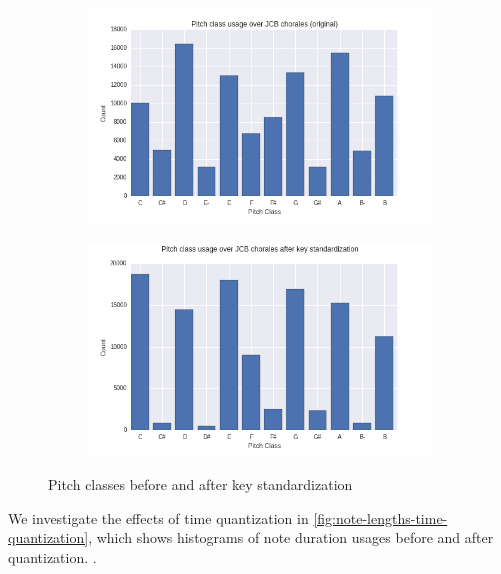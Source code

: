 \documentclass[dissertation.tex]{subfiles}
\begin{document}
\begin{figure}
    \centering
    \begin{subfigure}[b]{0.48\textwidth}
        \centering
        \includegraphics[width=1.0\linewidth]{Figures/pitch-class-usage-original.png}
    \end{subfigure}
    \begin{subfigure}[b]{0.48\textwidth}
        \centering
        \includegraphics[width=1.0\linewidth]{Figures/pitch-class-usage-preproc.png}
    \end{subfigure}
    \caption{Pitch classes before and after key standardization}
    \label{fig:pc-key-standardization}
\end{figure}

We investigate the effects of time quantization in
\autoref{fig:note-lengths-time-quantization}, which shows histograms of note
duration usages before and after quantization. .
\end{document}
